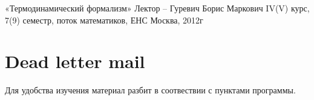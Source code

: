 \documentclass[10pt]{article}
\begin{document}
{«Термодинамический формализм»}
{Лектор -- Гуревич Борис Маркович}
{IV(V) курс, 7(9) семестр, поток математиков, ЕНС}
{Москва, 2012г}
\section*{Dead letter mail}


Для удобства изучения материал разбит в соотвествии с пунктами программы.













\tableofcontents
\end{document}
